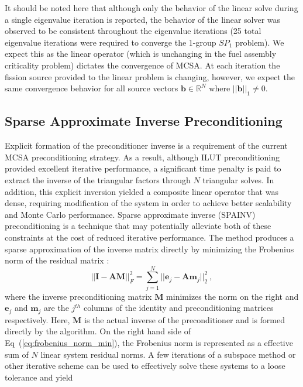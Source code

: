 It should be noted here that although only the behavior of the linear
solve during a single eigenvalue iteration is reported, the behavior
of the linear solver was observed to be consistent throughout the
eigenvalue iterations (25 total eigenvalue iterations were required to
converge the 1-group $SP_1$ problem). We expect this as the linear
operator (which is unchanging in the fuel assembly criticality
problem) dictates the convergence of MCSA. At each iteration the
fission source provided to the linear problem is changing, however, we
expect the same convergence behavior for all source vectors
$\mathbf{b} \in \mathbb{R}^{N}$ where $||\mathbf{b}||_1 \neq 0$.

\subsection{Sparse Approximate Inverse Preconditioning}
\label{subsec:spn_spainv_preconditioning}
Explicit formation of the preconditioner inverse is a requirement of
the current MCSA preconditioning strategy. As a result, although ILUT
preconditioning provided excellent iterative performance, a
significant time penalty is paid to extract the inverse of the
triangular factors through $N$ triangular solves. In addition, this
explicit inversion yielded a composite linear operator that was dense,
requiring modification of the system in order to achieve better
scalability and Monte Carlo performance. Sparse approximate inverse
(SPAINV) preconditioning is a technique that may potentially alleviate
both of these constraints at the cost of reduced iterative
performance. The method produces a sparse approximation of the inverse
matrix directly by minimizing the Frobenius norm of the residual
matrix \citep{saad_iterative_2003}:
\begin{equation}
  || \mathbf{I} - \mathbf{A} \mathbf{M} ||^2_F =
  \sum_{j=1}^N ||\mathbf{e}_j - \mathbf{A} \mathbf{m}_j||^2_2 \:,
  \label{eq:frobenius_norm_min}
\end{equation}
where the inverse preconditioning matrix $\mathbf{M}$ minimizes the
norm on the right and $\mathbf{e}_j$ and $\mathbf{m}_j$ are the
$j^{th}$ columns of the identity and preconditioning matrices
respectively. Here, $\mathbf{M}$ is the actual inverse of the
preconditioner and is formed directly by the algorithm. On the right
hand side of Eq~(\ref{eq:frobenius_norm_min}), the Frobenius norm is
represented as a effective sum of $N$ linear system residual norms. A
few iterations of a subspace method or other iterative scheme can be
used to effectively solve these systems to a loose tolerance and yield
